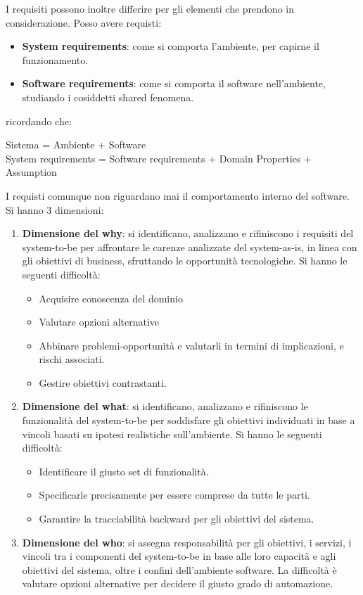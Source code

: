 I requisiti possono inoltre differire per gli elementi che prendono in considerazione. Posso avere requisti:
\begin{itemize}
    \item \textbf{System requirements}: come si comporta l'ambiente, per capirne il funzionamento.
    \item \textbf{Software requirements}: come si comporta il software nell'ambiente, studiando i cosiddetti shared fenomena.
\end{itemize}
ricordando che:
\begin{center}
    Sistema = Ambiente + Software \\ System requirements = Software requirements + Domain Properties + Assumption
\end{center}
I requisti comunque non riguardano mai il comportamento interno del software. \newline Si hanno 3 dimensioni:
\begin{enumerate}
    \item \textbf{Dimensione del why}: si identificano, analizzano e rifiniscono i requisiti del system-to-be per affrontare le carenze analizzate del system-as-is, in linea con gli obiettivi di business, sfruttando le opportunità tecnologiche. Si hanno le seguenti difficoltà:
    \begin{itemize}
        \item Acquisire conoscenza del dominio
        \item Valutare opzioni alternative
        \item Abbinare problemi-opportunità e valutarli in termini di implicazioni, e rischi associati.
        \item Gestire obiettivi contrastanti.
    \end{itemize}
    \item \textbf{Dimensione del what}: si identificano, analizzano e rifiniscono le funzionalità del system-to-be per soddisfare gli obiettivi individuati in base a vincoli basati su ipotesi realistiche sull'ambiente. Si hanno le seguenti difficoltà:
    \begin{itemize}
        \item Identificare il giusto set di funzionalità.
        \item Specificarle precisamente per essere comprese da tutte le parti.
        \item Garantire la tracciabilità backward per gli obiettivi del sistema.
    \end{itemize}
    \item \textbf{Dimensione del who}: si assegna responsabilità per gli obiettivi, i servizi, i vincoli tra i componenti del system-to-be in base alle loro capacità e agli obiettivi del sistema, oltre i confini dell'ambiente software. La difficoltà è valutare opzioni alternative per decidere il giusto grado di automazione. 
\end{enumerate}

